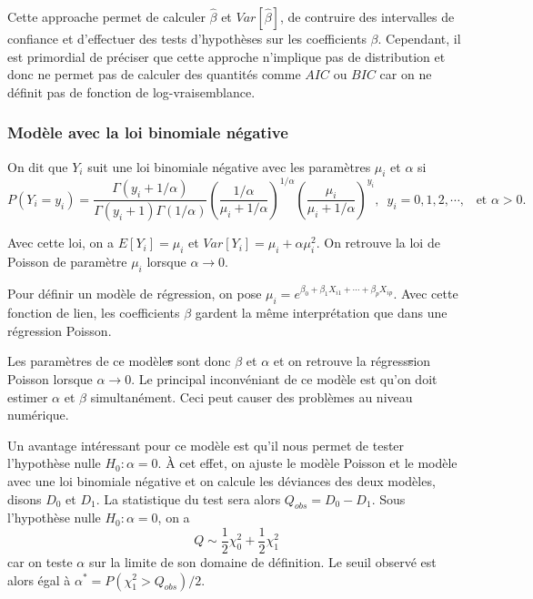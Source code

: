 \documentclass[11pt]{article}
\begin{document}
\noindent Cette approache permet de calculer $\hat\beta$ et $Var[\hat\beta]$, de contruire des intervalles de confiance et d'effectuer des tests d'hypoth\`eses sur les coefficients $\beta$. Cependant, il est primordial de pr\'eciser que cette approche n'implique pas de distribution et donc ne permet pas de calculer des quantit\'es comme $AIC$ ou $BIC$ car on ne d\'efinit pas de fonction de log-vraisemblance.

\subsubsection{Mod\`ele avec la loi binomiale n\'egative}

On dit que $Y_i$ suit une loi binomiale n\'egative avec les param\`etres $\mu_i$ et $\alpha$ si 
$$P(Y_i=y_i) = \frac{\Gamma(y_i+1/\alpha)}{\Gamma(y_i+1)\Gamma(1/\alpha)} \left(\frac{1/\alpha}{\mu_i+1/\alpha}\right)^{1/\alpha} \left(\frac{\mu_i}{\mu_i+1/\alpha}\right)^{y_i}, \, \, \, y_i=0,1,2,\cdots, \, \, \, \mbox{ et } \alpha>0.$$

\noindent Avec cette loi, on a $E[Y_i]=\mu_i$ et $Var[Y_i]=\mu_i+\alpha \mu_i^2$. On retrouve la loi de Poisson de param\`etre $\mu_i$ lorsque $\alpha \rightarrow 0$.

\noindent Pour d\'efinir un mod\`ele de r\'egression, on pose $\mu_i = e^{\beta_0+\beta_1 X_{i1}+\cdots+\beta_p X_{ip}}$. Avec cette fonction de lien, les coefficients $\beta$ gardent la m\^eme interpr\'etation que dans une r\'egression Poisson.

\noindent Les param\`etres de ce mod\`ele\sout{s} sont donc $\beta$ et $\alpha$ et on retrouve la r\'egress\sout{s}ion Poisson lorsque $\alpha \rightarrow 0$. Le principal inconv\'eniant de ce mod\`ele est qu'on doit estimer $\alpha$ et $\beta$ simultan\'ement. Ceci peut causer des probl\`emes au niveau num\'erique.

\noindent Un avantage int\'eressant pour ce mod\`ele est qu'il nous permet de tester l'hypoth\`ese nulle $H_0:\alpha=0$. \`A cet effet, on ajuste le mod\`ele Poisson et le mod\`ele avec une loi binomiale n\'egative et on calcule les d\'eviances des deux mod\`eles, disons $D_0$ et $D_1$. La statistique du test sera alors $Q_{obs}=D_0-D_1$. Sous l'hypoth\`ese nulle $H_0:\alpha=0$, on a $$Q \sim \frac{1}{2} \chi^2_0 + \frac{1}{2} \chi^2_1$$
car on teste $\alpha$ sur la limite de son domaine de d\'efinition. Le seuil observ\'e est alors \'egal \`a $\alpha^*=P(\chi^2_1>Q_{obs})/2$. 
\end{document}
